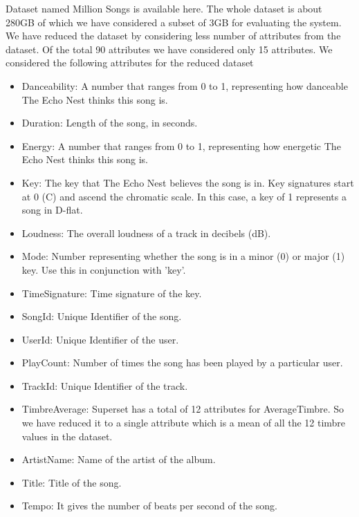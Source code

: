 \documentclass{sig-alternate-05-2015}
\begin{document}
Dataset named Million Songs is available here. The whole dataset is about 280GB of which we have considered a subset of 3GB for evaluating the system. We have reduced the dataset by considering less number of attributes from the dataset. Of the total 90 attributes we have considered only 15 attributes. We considered the following attributes for the reduced dataset
\begin{itemize}
    \item Danceability: A number that ranges from 0 to 1, representing how danceable The Echo Nest thinks this song is.
    \item Duration: Length of the song, in seconds.
    \item Energy: A number that ranges from 0 to 1, representing how energetic The Echo Nest thinks this song is.
    \item Key: The key that The Echo Nest believes the song is in. Key signatures start at 0 (C) and ascend the chromatic scale. In this case, a key of 1 represents a song in D-flat.
    \item Loudness: The overall loudness of a track in decibels (dB).
    \item Mode: Number representing whether the song is in a minor (0) or major (1) key. Use this in conjunction with 'key'.
    \item TimeSignature: Time signature of the key.
    \item SongId: Unique Identifier of the song.
    \item UserId: Unique Identifier of the user.
    \item PlayCount: Number of times the song has been played by a particular user.
    \item TrackId: Unique Identifier of the track.
    \item TimbreAverage: Superset has a total of 12 attributes for AverageTimbre. So we have reduced it to a single attribute which is a mean of all the 12 timbre values in the dataset.
    \item ArtistName: Name of the artist of the album.
    \item Title: Title of the song.
    \item Tempo: It gives the number of beats per second of the song.
\end{itemize}
\end{document}
